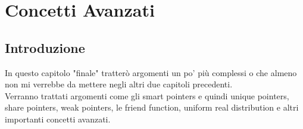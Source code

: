 
\chapter{Concetti Avanzati}













\section{Introduzione}

\textsf{\small In questo capitolo "finale" tratterò argomenti un po' più complessi o che almeno non mi verrebbe da mettere negli altri due capitoli precedenti.} \\

\textsf{\small Verranno trattati argomenti come gli smart pointers e quindi unique pointers, share pointers, weak pointers, le friend function, uniform real distribution e altri importanti concetti avanzati.} \\

